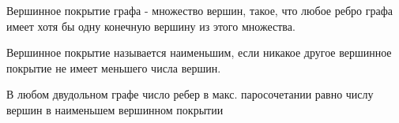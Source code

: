 \documentclass[discrete.tex]{subfiles}
\begin{document}
\begin{definition}
    Вершинное покрытие графа - множество вершин, такое, что любое ребро графа 
    имеет хотя бы одну конечную вершину из этого множества.
\end{definition}

\begin{definition}
    Вершинное покрытие называется наименьшим, если никакое другое вершинное покрытие не 
    имеет меньшего числа вершин.
\end{definition}

\begin{theorem} [Кёнига]
    В любом двудольном графе число ребер в макс. паросочетании равно числу вершин в 
    наименьшем вершинном покрытии
\end{theorem}
\end{document}

